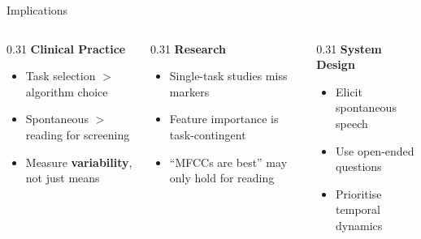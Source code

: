 \documentclass[aspectratio=169,11pt]{beamer}
\begin{document}
\begin{frame}{Implications}
    \begin{columns}[T]
        \begin{column}{0.31\textwidth}
            \textbf{\color{uofgblue}\faStethoscope\hspace{0.3em} Clinical Practice}
            
            \vspace{0.3cm}
            
            \small
            \begin{itemize}
                \item Task selection $>$ algorithm choice
                \item Spontaneous $>$ reading for screening
                \item Measure \textbf{variability}, not just means
            \end{itemize}
        \end{column}
        
        \begin{column}{0.31\textwidth}
            \textbf{\color{uofgblue}\faFlask\hspace{0.3em} Research}
            
            \vspace{0.3cm}
            
            \small
            \begin{itemize}
                \item Single-task studies miss markers
                \item Feature importance is task-contingent
                \item ``MFCCs are best'' may only hold for reading
            \end{itemize}
        \end{column}
        
        \begin{column}{0.31\textwidth}
            \textbf{\color{uofgblue}\faCogs\hspace{0.3em} System Design}
            
            \vspace{0.3cm}
            
            \small
            \begin{itemize}
                \item Elicit spontaneous speech
                \item Use open-ended questions
                \item Prioritise temporal dynamics
            \end{itemize}
        \end{column}
    \end{columns}
\end{frame}
\end{document}
